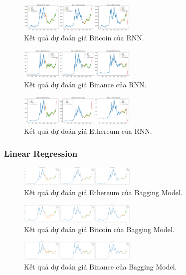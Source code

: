 \documentclass[conference]{IEEEtran}
\begin{document}
\begin{figure}[H]
    \centering
    \includegraphics[width=0.5\textwidth]{bibliography/pictures/RNNbtc.png}
    \caption{Kết quả dự đoán giá Bitcoin của RNN.}
\end{figure}
\begin{figure}[H]
    \centering
    \includegraphics[width=0.5\textwidth]{bibliography/pictures/RNNbnb.png}
    \caption{Kết quả dự đoán giá Binance của RNN.}
\end{figure}
\begin{figure}[H]
    \centering
    \includegraphics[width=0.5\textwidth]{bibliography/pictures/RNNeth.png}
    \caption{Kết quả dự đoán giá Ethereum của RNN.}
\end{figure}

\subsubsection{Linear Regression}
\begin{figure}[H]
    \centering
    \includegraphics[width=0.5\textwidth]{bibliography/pictures/Bagging_ETH.png}
    \caption{Kết quả dự đoán giá Ethereum của Bagging Model.}
\end{figure}
\begin{figure}[H]
    \centering
    \includegraphics[width=0.5\textwidth]{bibliography/pictures/Bagging_BTC.png}
    \caption{Kết quả dự đoán giá Bitcoin của Bagging Model.}
\end{figure}
\begin{figure}[H]
    \centering
    \includegraphics[width=0.5\textwidth]{bibliography/pictures/Bagging_BNB.png}
    \caption{Kết quả dự đoán giá Binance của Bagging Model.}
\end{figure}
\end{document}
